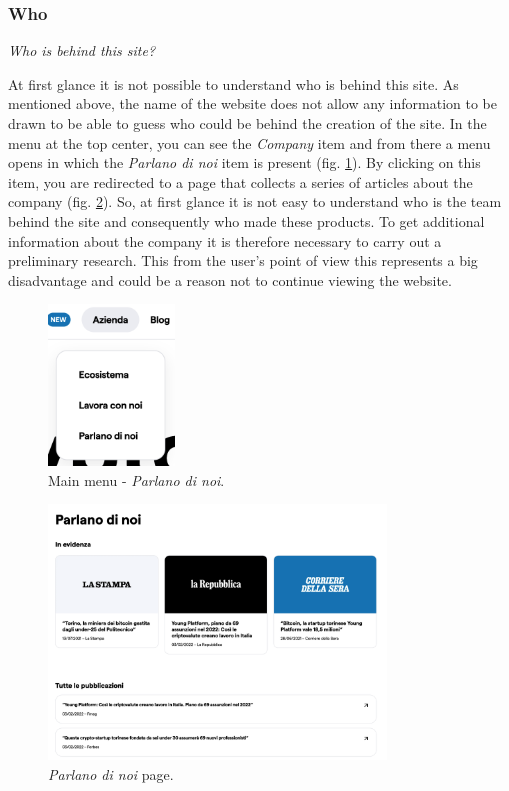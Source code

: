 \subsubsection{Who}

\centerline{\textit{Who is behind this site?}}
At first glance it is not possible to understand who is behind this site. 
As mentioned above, the name of the website does not allow any information 
to be drawn to be able to guess who could be behind the creation of the 
site. In the menu at the top center, you can see the \textit{Company} item 
and from there a menu opens in which the \textit{Parlano di noi} item is 
present (fig. \ref{fig:who-we-are-1}). By clicking on this item, you are 
redirected to a page that collects a series of articles about the company 
(fig. \ref{fig:who-we-are-2}). So, at first glance it is not easy to 
understand who is the team behind the site and consequently who made 
these products. To get additional information about the company it is 
therefore necessary to carry out a preliminary research. This from the 
user's point of view this represents a big disadvantage and could be a 
reason not to continue viewing the website.

\begin{figure}[H]
	\centering
	\includegraphics[width=0.30\textwidth]{res/images/who-we-are-1.png}
	\caption{Main menu - \textit{Parlano di noi}.}
	\label{fig:who-we-are-1}
\end{figure}

\begin{figure}[H]
	\centering
	\includegraphics[width=0.80\textwidth]{res/images/who-we-are-2.png}
	\caption{\textit{Parlano di noi} page.}
	\label{fig:who-we-are-2}
\end{figure}

